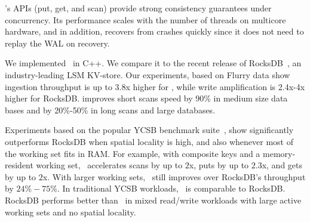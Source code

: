 \sys's APIs (put, get, and scan) provide strong consistency guarantees 
under concurrency.  Its performance scales with the number of threads on multicore hardware, 
and
in addition, \sys\/ recovers from crashes quickly since it does not need to replay the WAL on recovery.

We implemented \sys\ in C++. 
We compare it to the recent release of RocksDB~\cite{RocksDB}, 
an industry-leading LSM KV-store.
Our experiments, based on Flurry data show ingestion throughput is up to 3.8x higher for \sys, while write amplification is 2.4x-4x higher for RocksDB. \sys improves short scans speed by 90\% in medium size data bases and by 20\%-50\% in long scans and large databases.

Experiments based on the popular YCSB benchmark suite~\cite{YCSB}, 
show \sys\/ significantly outperforms RocksDB when spatial  locality is high, and also 
whenever most of the working set fits in RAM. For example, with composite keys and a memory-resident 
working set, \sys\  accelerates scans by up to $2$x, puts by up to $2.3$x, and gets by up to $2$x. 
With larger working sets, \sys\ still improves over RocksDB's throughput by $24\% - 75\%$. In traditional
YCSB workloads,  \sys\ is comparable to RocksDB. RocksDB performs better than 
\sys\ in mixed read/write workloads with large active working sets and no spatial locality. 

